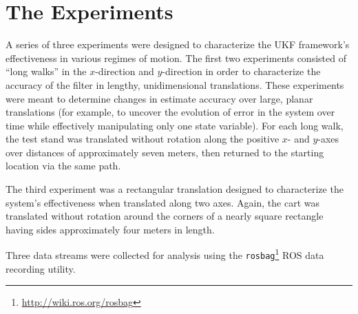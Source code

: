 \clearpage

\section{The Experiments}

A series of three experiments were designed to characterize the UKF framework's effectiveness in various regimes of motion. The first two experiments consisted of ``long walks'' in the $x$-direction and $y$-direction in order to characterize the accuracy of the filter in lengthy, unidimensional translations. These experiments were meant to determine changes in estimate accuracy over large, planar translations (for example, to uncover the evolution of error in the system over time while effectively manipulating only one state variable). For each long walk, the test stand was translated without rotation along the positive $x$- and $y$-axes over distances of approximately seven meters, then returned to the starting location via the same path.

The third experiment was a rectangular translation designed to characterize the system's effectiveness when translated along two axes. Again, the cart was translated without rotation around the corners of a nearly square rectangle having sides approximately four meters in length.

Three data streams were collected for analysis using the \texttt{rosbag}\footnote{\url{http://wiki.ros.org/rosbag}} ROS data recording utility.

